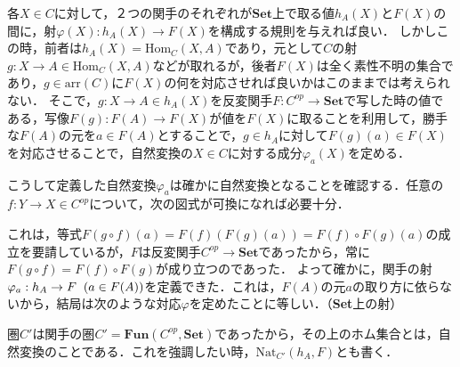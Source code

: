 \documentclass[uplatex, 12pt, dvipdfmx]{jsreport}
\begin{document}
各$X\in C$に対して，２つの関手のそれぞれが$\mathbf{Set}$上で取る値$h_A(X)$と$F(X)$の間に，射$\varphi (X):h_A(X)\to F(X)$を構成する規則を与えれば良い．
しかしこの時，前者は$h_A(X)=\mathrm{Hom}_C(X,A)$であり，元として$C$の射$g:X\to A \in \mathrm{Hom}_C(X,A)$などが取れるが，後者$F(X)$は全く素性不明の集合であり，$g\in\mathrm{arr}(C)$に$F(X)$の何を対応させれば良いかはこのままでは考えられない．
そこで，$g:X\to A\in h_A(X)$を反変関手$F:C^{op}\to\mathbf{Set}$で写した時の値である，写像$F(g):F(A)\to F(X)$が値を$F(X)$に取ることを利用して，勝手な$F(A)$の元を$a\in F(A)$とすることで，$g\in h_A$に対して$F(g)(a)\in F(X)$を対応させることで，自然変換の$X\in C$に対する成分$\varphi_a(X)$を定める．
\begin{center}\end{center}
こうして定義した自然変換$\varphi_a$は確かに自然変換となることを確認する．任意の$f:Y\to X\in C^{op}$について，次の図式が可換になれば必要十分．
\begin{center}\end{center}
これは，等式$F(g\circ f)(a)=F(f)(F(g)(a))=F(f)\circ F(g)(a)$の成立を要請しているが，$F$は反変関手$C^{op}\to\mathbf{Set}$であったから，常に$F(g\circ f)=F(f)\circ F(g)$が成り立つのであった．
よって確かに，関手の射$\varphi_a:h_A\to F\hspace{2mm}(a\in F(A))$を定義できた．これは，$F(A)$の元$a$の取り方に依らないから，結局は次のような対応$\varphi$を定めたことに等しい．（\textbf{Set}上の射）
\begin{center}\end{center}
圏$C'$は関手の圏$C'=\mathbf{Fun}(C^{op},\mathbf{Set})$であったから，その上のホム集合とは，自然変換のことである．これを強調したい時，$\mathrm{Nat}_{C'}(h_A,F)$とも書く．
\end{document}
